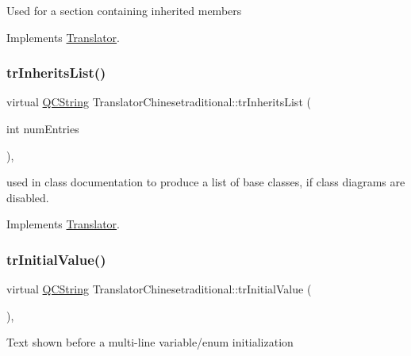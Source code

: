 Used for a section containing inherited members 

Implements \mbox{\hyperlink{class_translator}{Translator}}.

\mbox{\label{class_translator_chinesetraditional_a87374f3d1f0381391d6bc2841281353f}} 
\subsubsection{\texorpdfstring{trInheritsList()}{trInheritsList()}}
{\footnotesize\ttfamily virtual \mbox{\hyperlink{class_q_c_string}{Q\+C\+String}} Translator\+Chinesetraditional\+::tr\+Inherits\+List (\begin{DoxyParamCaption}\item[{int}]{num\+Entries }\end{DoxyParamCaption})\hspace{0.3cm}{\ttfamily [inline]}, {\ttfamily [virtual]}}

used in class documentation to produce a list of base classes, if class diagrams are disabled. 

Implements \mbox{\hyperlink{class_translator}{Translator}}.

\mbox{\label{class_translator_chinesetraditional_ad818eb8e6c599cea1267baf01a118ce9}} 
\subsubsection{\texorpdfstring{trInitialValue()}{trInitialValue()}}
{\footnotesize\ttfamily virtual \mbox{\hyperlink{class_q_c_string}{Q\+C\+String}} Translator\+Chinesetraditional\+::tr\+Initial\+Value (\begin{DoxyParamCaption}{ }\end{DoxyParamCaption})\hspace{0.3cm}{\ttfamily [inline]}, {\ttfamily [virtual]}}

Text shown before a multi-\/line variable/enum initialization 

